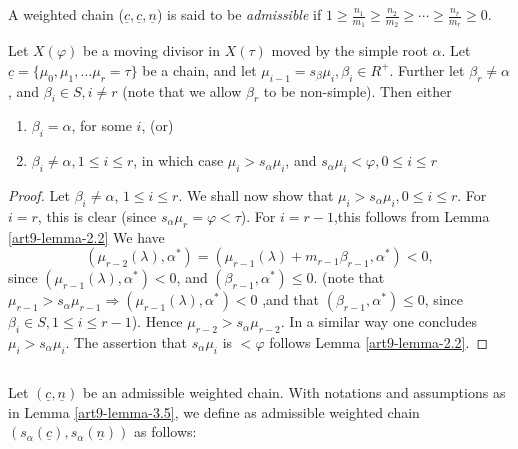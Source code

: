 \begin{definition}\label{art9-definition-3.4}
A weighted chain ($\underline{c}, \underline{c}, \underline{n} $) is said to be \textit{admissible} if $1 \geq \frac{n_{1}}{m_{1}}\geq \frac{n_{2}}{m_{2}}\geq \cdots \geq \frac{n_{r}}{m_{r}}\geq 0$.
\end{definition}

\begin{lemma}\label{art9-lemma-3.5}
Let $X(\varphi)$ be a moving divisor in $X(\tau)$ moved by the simple root $\alpha$. Let $\underline{c} = \{\mu_{0}, \mu_{1}, \ldots \mu_{r} = \tau\}$ be a chain, and let $\mu_{i-1} = s_{\beta}\mu_{i}, \beta_{i} \in R^{+}$. Further let
$\beta_{r} \neq \alpha$, and $\beta_{i} \in S, i\neq r$ (note that we allow $\beta_{r}$ to be non-simple). Then either
\begin{enumerate}[(1)]
\item $\beta_{i}=\alpha$, for some $i$, {\rm(or)}\label{art9-lemma3.5-enum-1}
\item $\beta_{i} \neq \alpha, 1 \leq i \leq r$, in which case $\mu_{i} > s_{\alpha}\mu_{i}$, and $s_{\alpha}\mu_{i} < \varphi, 0 \leq i \leq r$\label{art9-lemma3.5-enum-1}
\end{enumerate}
\end{lemma}

\begin{proof}
Let $\beta_{i} \neq \alpha$, $ 1 \leq i \leq r$. We shall now show that $ \mu_{i} > s_{\alpha}\mu_{i}, 0 \leq i \leq r$.
For $i=r$, this is clear (since $s_{\alpha}\mu_{r}= \varphi < \tau$). For $i=r-1$,this follows from Lemma
\ref{art9-lemma-2.2} We have
$$
(\mu_{r-2}(\lambda), \alpha^{*})= (\mu_{r-1}(\lambda)+ m_{r-1} \beta_{r-1}, \alpha^{*})< 0,
$$
since $(\mu_{r-1}(\lambda), \alpha^{*})< 0$, and $(\beta_{r-1}, \alpha^{*})\leq 0$. (note that $\mu_{r-1} > s_{\alpha}\mu_{r-1} \Rightarrow (\mu_{r-1}(\lambda), \alpha^{*})< 0$ ,and that $(\beta_{r-1}, \alpha^{*})\leq 0$, since $\beta_{i} \in S, 1\leq i \leq r-1$). Hence $\mu_{r-2} > s_{\alpha}\mu_{r-2}$. In a similar way one concludes $\mu_{i} > s_{\alpha}\mu_{i}$. The assertion that $s_{\alpha}\mu_{i}$ is $< \varphi$ follows Lemma \ref{art9-lemma-2.2}.
\end{proof}

\setcounter{subsection}{5}
\subsection{}\label{art9-subsec-3.6}

Let $(\underline{c}, \underline{n})$ be an admissible weighted chain. With notations and assumptions as in
Lemma \ref{art9-lemma-3.5}, we define as admissible weighted chain $(s_{\alpha}(\underline{c}), s_{\alpha}(\underline{n}))$ as follows:

